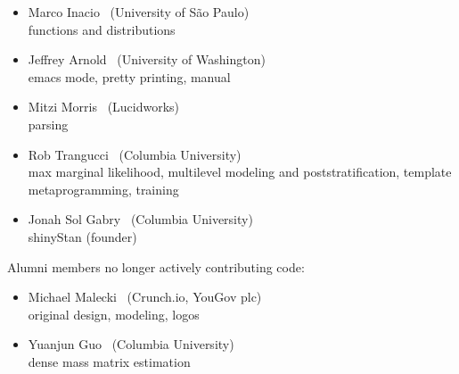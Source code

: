 \begin{itemize}
\\ {\footnotesize PyStan (founder)}
\item Marco Inacio \   (University of S\~{a}o Paulo)
\\ {\footnotesize functions and distributions}
\item Jeffrey Arnold \   (University of Washington)
\\ {\footnotesize emacs mode, pretty printing, manual}
\item Mitzi Morris \   (Lucidworks)
\\ {\footnotesize parsing}
\item Rob Trangucci \   (Columbia University)
\\ {\footnotesize max marginal likelihood, multilevel modeling and
  poststratification, template metaprogramming, training}
\item Jonah Sol Gabry \ (Columbia University)
\\ {\footnotesize shinyStan (founder)}
\end{itemize}

\vspace*{12pt}

\noindent
Alumni members no longer actively contributing code:
\begin{itemize}
\item Michael Malecki \ (Crunch.io, YouGov plc)
\\ {\footnotesize original design, modeling, logos}
\item Yuanjun Guo \ (Columbia University)
\\ {\footnotesize dense mass matrix estimation}
\end{itemize}